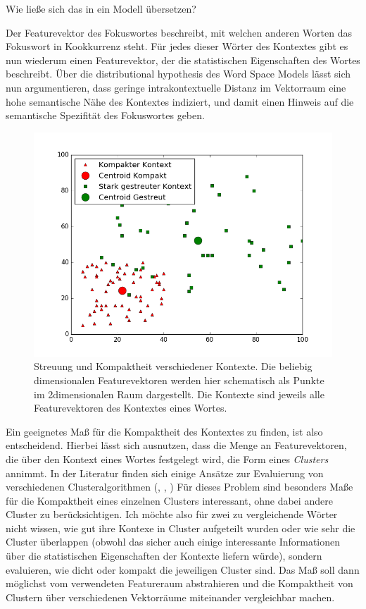 \documentclass[11pt,numbers=noenddot]{scrartcl}
\begin{document}
Wie ließe sich das in ein Modell übersetzen?

Der Featurevektor des Fokuswortes beschreibt, mit welchen anderen Worten das Fokuswort in Kookkurrenz steht. Für jedes dieser Wörter des Kontextes gibt es nun wiederum einen Featurevektor, der die statistischen Eigenschaften des Wortes beschreibt. Über die distributional hypothesis des Word Space Models lässt sich nun argumentieren, dass geringe intrakontextuelle Distanz im Vektorraum eine hohe semantische Nähe des Kontextes indiziert, und damit einen Hinweis auf die semantische Spezifität des Fokuswortes geben.

\begin{figure}
    \includegraphics[width = \textwidth]{kontext}
    \caption{Streuung und Kompaktheit verschiedener Kontexte. Die beliebig dimensionalen Featurevektoren werden hier schematisch als Punkte im 2dimensionalen Raum dargestellt. Die Kontexte sind jeweils alle Featurevektoren des Kontextes eines Wortes.}
    \label{kontext}
\end{figure}

Ein geeignetes Maß für die Kompaktheit des Kontextes zu finden, ist also entscheidend. Hierbei lässt sich ausnutzen, dass die Menge an Featurevektoren, die über den Kontext eines Wortes festgelegt wird, die Form eines \emph{Clusters} annimmt. In der Literatur finden sich einige Ansätze zur Evaluierung von verschiedenen Clusteralgorithmen (\citet{dunn1974}, \citet{Halkidi2001}, ) Für dieses Problem sind besonders Maße für die Kompaktheit eines einzelnen Clusters interessant, ohne dabei andere Cluster zu berücksichtigen. Ich möchte also für zwei zu vergleichende Wörter nicht wissen, wie gut ihre Kontexe in Cluster aufgeteilt wurden oder wie sehr die Cluster überlappen (obwohl das sicher auch einige interessante Informationen über die statistischen Eigenschaften der Kontexte liefern würde), sondern evaluieren, wie dicht oder kompakt die jeweiligen Cluster sind. Das Maß soll dann möglichst vom verwendeten Featureraum abstrahieren und die Kompaktheit von Clustern über verschiedenen Vektorräume miteinander vergleichbar machen.
\end{document}
